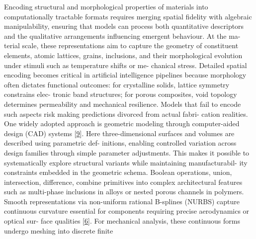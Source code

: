 \documentclass[
]{article}
\begin{document}
Encoding structural and morphological properties of materials into
computationally tractable formats requires merging spatial fidelity with
algebraic manipulability, ensuring that models can process both
quantitative descriptors and the qualitative arrangements influencing
emergent behaviour. At the ma- terial scale, these representations aim
to capture the geometry of constituent elements, atomic lattices,
grains, inclusions, and their morphological evolution under stimuli such
as temperature shifts or me- chanical stress. Detailed spatial encoding
becomes critical in artificial intelligence pipelines because morphology
often dictates functional outcomes: for crystalline solids, lattice
symmetry constrains elec- tronic band structures; for porous composites,
void topology determines permeability and mechanical resilience. Models
that fail to encode such aspects risk making predictions divorced from
actual fabri- cation realities. One widely adopted approach is geometric
modeling through computer-aided design (CAD) systems
{[}\hyperref[_bookmark49]{9}{]}. Here three-dimensional surfaces and
volumes are described using parametric def- initions, enabling
controlled variation across design families through simple parameter
adjustments. This makes it possible to systematically explore structural
variants while maintaining manufacturabil- ity constraints embedded in
the geometric schema. Boolean operations, union, intersection,
difference, combine primitives into complex architectural features such
as multi-phase inclusions in alloys or nested porous channels in
polymers. Smooth representations via non-uniform rational B-splines
(NURBS) capture continuous curvature essential for components requiring
precise aerodynamics or optical sur- face qualities
{[}\hyperref[_bookmark46]{6}{]}. For mechanical analysis, these
continuous forms undergo meshing into discrete finite
\end{document}
